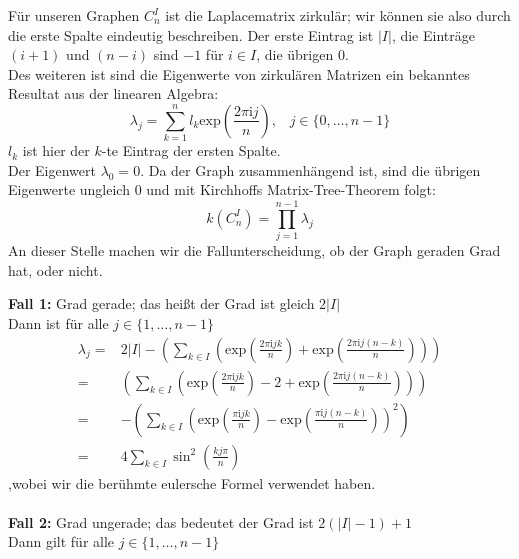 Für unseren Graphen $C_n^I$ ist die Laplacematrix zirkulär; wir können sie also durch die erste Spalte eindeutig beschreiben. Der erste Eintrag ist $|I|$, die Einträge $(i+1)$  und $(n-i)$ sind $-1$ für $i \in I$, die übrigen $0$.\\
Des weiteren ist sind die Eigenwerte von zirkulären Matrizen ein bekanntes Resultat aus der linearen Algebra:
\begin{equation}
 \lambda_j = \sum_{k=1}^{n}l_k\mathrm{exp}{\left(\frac{2\pi \mathrm{i}j}{n}\right)}, \,\,\,\,\, {j\in\{0,\ldots,n-1\}}
\end{equation}
$l_k$ ist hier der $k$-te Eintrag der ersten Spalte.\\ 
Der Eigenwert $\lambda_0 = 0$. Da der Graph zusammenhängend ist, sind die übrigen Eigenwerte ungleich $0$ und mit Kirchhoffs Matrix-Tree-Theorem folgt:
\begin{equation}
 \mathit{k}(C_n^I)=\prod_{j=1}^{n-1} \lambda_j
\end{equation}
An dieser Stelle machen wir die Fallunterscheidung, ob der Graph geraden Grad hat, oder nicht.\\
\par
\begingroup
\leftskip=20pt
\rightskip=20pt
\noindent
\textbf{Fall 1:} Grad gerade; das heißt der Grad ist gleich $2|I|$\\
Dann ist für alle $j \in \{1,\ldots,n-1\}$
\begin{equation}
\begin{aligned}
 \lambda_j = {} & {2|I| - \left( \sum_{k\in I}\left(\mathrm{exp}{\left(\frac{2\pi \mathrm{i}jk}{n}\right)} + \mathrm{exp}{\left(\frac{2\pi \mathrm{i}j(n-k)}{n}\right)}\right)\right)}\\
 = {} & {\left( \sum_{k\in I}\left(\mathrm{exp}{\left(\frac{2\pi \mathrm{i}jk}{n}\right)} - 2 + \mathrm{exp}{\left(\frac{2\pi \mathrm{i}j(n-k)}{n}\right)}\right)\right)}\\
 = {} &-\left( \sum_{k\in I}\left(\mathrm{exp}{\left(\frac{\pi \mathrm{i}jk}{n}\right)} - \mathrm{exp}{\left(\frac{\pi \mathrm{i}j(n-k)}{n}\right)}\right)^2\right)\\
 ={} & 4\sum_{k\in I} \sin^2 \left( \frac{kj\pi}{n}\right)
 \end{aligned}
\end{equation}
,wobei wir die berühmte eulersche Formel verwendet haben.\\
\\ \textbf{Fall 2:} Grad ungerade; das bedeutet der Grad ist $2(|I|-1) + 1$\\
Dann gilt für alle $j \in \{1,\ldots,n-1\}$
